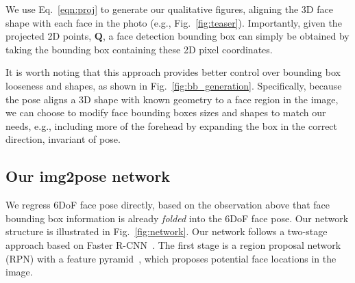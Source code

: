 \documentclass[final]{cvpr}
\begin{document}
We use Eq.~\eqref{eqn:proj} to generate our qualitative figures, aligning the 3D face shape with each face in the photo (e.g., Fig.~\ref{fig:teaser}). Importantly, given the projected 2D points, $\mathbf{Q}$, a face detection bounding box can simply be obtained by taking the bounding box containing these 2D pixel coordinates. 

It is worth noting that this approach provides better control over bounding box looseness and shapes, as shown in Fig.~\ref{fig:bb_generation}. Specifically, because the pose aligns a 3D shape with known geometry to a face region in the image, we can choose to modify face bounding boxes sizes and shapes to match our needs, e.g., including more of the forehead by expanding the box in the correct direction, invariant of pose.

\begin{figure}[!t]
\end{figure}


\subsection{Our img2pose network}
\label{sec:network}
We regress 6DoF face pose directly, based on the observation above that face bounding box information is already {\em folded} into the 6DoF face pose. Our network structure is illustrated in Fig.~\ref{fig:network}. Our network follows a two-stage approach based on Faster R-CNN~\cite{faster_rcnn}. The first stage is a region proposal network (RPN) with a feature pyramid~\cite{fpn}, which proposes potential face locations in the image. 

\begin{figure*}[ht]
\end{figure*}
\end{document}
